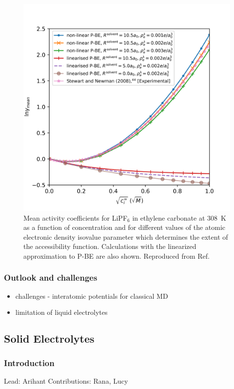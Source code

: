 \documentclass[journal=jacsat,manuscript=article]{achemso}
\begin{document}
\begin{figure}
    \includegraphics[scale=1]{figures/lipf6.png}
    \caption{Mean activity coefficients for LiPF$_6$ in ethylene carbonate at 308~K as a function of concentration and for different values of the atomic electronic density isovalue parameter which determines the extent of the accessibility function. Calculations with the linearized approximation to P-BE are also shown. Reproduced from Ref. }
    \label{fig:ac}
\end{figure}
    
\subsubsection{Outlook and challenges}
\begin{itemize}
    \item challenges - interatomic potentials for classical MD
    \item limitation of liquid electrolytes
\end{itemize}

\subsection{Solid Electrolytes}

\subsubsection{Introduction}
Lead: Arihant
Contributions: Rana, Lucy
\end{document}

